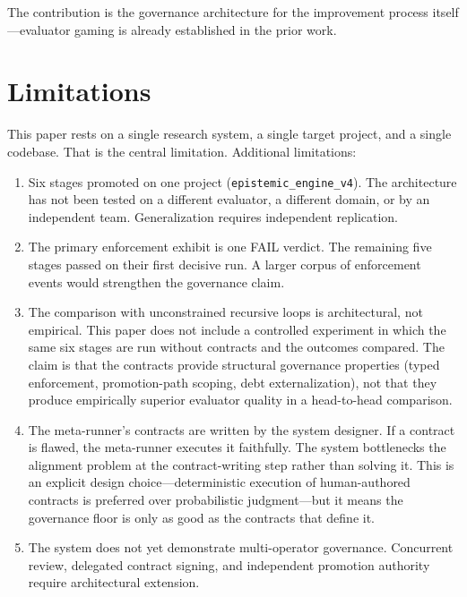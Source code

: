 \documentclass[11pt]{article}
\begin{document}
The contribution is the governance architecture for the improvement process itself---evaluator gaming is already established in the prior work.


\section{Limitations}

This paper rests on a single research system, a single target project, and a single codebase. That is the central limitation. Additional limitations:

\begin{enumerate}[label=(\alph*),nosep]
\item Six stages promoted on one project (\texttt{epistemic\_engine\_v4}). The architecture has not been tested on a different evaluator, a different domain, or by an independent team. Generalization requires independent replication.

\item The primary enforcement exhibit is one FAIL verdict. The remaining five stages passed on their first decisive run. A larger corpus of enforcement events would strengthen the governance claim.

\item The comparison with unconstrained recursive loops is architectural, not empirical. This paper does not include a controlled experiment in which the same six stages are run without contracts and the outcomes compared. The claim is that the contracts provide structural governance properties (typed enforcement, promotion-path scoping, debt externalization), not that they produce empirically superior evaluator quality in a head-to-head comparison.

\item The meta-runner's contracts are written by the system designer. If a contract is flawed, the meta-runner executes it faithfully. The system bottlenecks the alignment problem at the contract-writing step rather than solving it. This is an explicit design choice---deterministic execution of human-authored contracts is preferred over probabilistic judgment---but it means the governance floor is only as good as the contracts that define it.

\item The system does not yet demonstrate multi-operator governance. Concurrent review, delegated contract signing, and independent promotion authority require architectural extension.
\end{enumerate}
\end{document}
